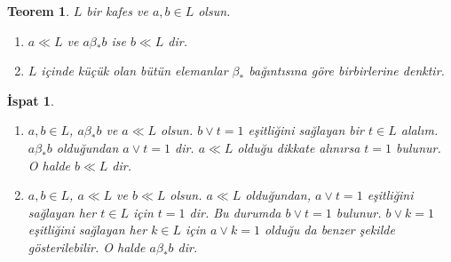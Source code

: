 \documentclass[a4paper,12pt]{article}
\numberwithin{equation}{section}
\theoremstyle{italik}
\newtheorem{teorem}{Teorem}[section]
\newtheorem*{ispat}{İspat}
\begin{document}

\begin{teorem} \label{4}
    $ L $ bir kafes ve $ a,b \in L $ olsun.
    \begin{enumerate}
        \item $ a \ll L $ ve $ a \beta_* b $ ise $ b \ll L $ dir.
        \item $ L $ içinde küçük olan bütün elemanlar $ \beta_* $ bağıntısına göre birbirlerine denktir.
    \end{enumerate}
\end{teorem}
\begin{ispat}
    \begin{enumerate}
        \item
            $ a,b \in L $, $ a \beta_* b $ ve $ a \ll L $ olsun. 
            $ b \vee t = 1 $ eşitliğini sağlayan bir $ t \in L $ alalım. 
            $ a \beta_* b $ olduğundan $ a \vee t = 1 $ dir. $ a \ll L $ olduğu dikkate alınırsa $ t = 1 $ bulunur. 
            O halde $ b \ll L $ dir.
        \item
            $ a,b \in L $, $ a \ll L $ ve $ b \ll L $ olsun. $ a \ll L $ olduğundan, $ a \vee t = 1 $ eşitliğini sağlayan 
            her $ t \in L $ için $ t = 1 $ dir. Bu durumda $ b \vee t = 1 $ bulunur. $ b \vee k = 1 $ eşitliğini sağlayan 
            her $ k \in L $ için $ a \vee k = 1 $ olduğu da benzer şekilde gösterilebilir. O halde $ a \beta_* b $ dir. 
    \end{enumerate}
\end{ispat}

\end{document}

